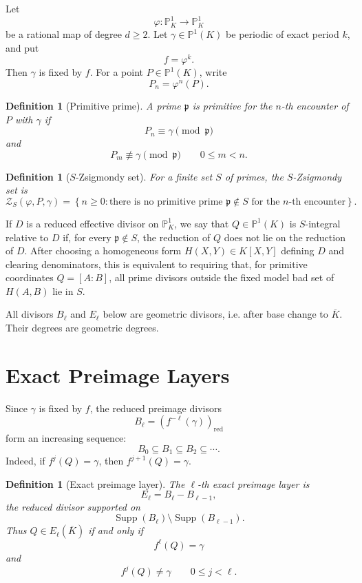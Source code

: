 \documentclass[11pt]{article}
\newtheorem{definition}[theorem]{Definition}
\begin{document}
Let
\[
\varphi:\mathbb P^1_K\to\mathbb P^1_K
\]
be a rational map of degree \(d\ge2\). Let \(\gamma\in\mathbb P^1(K)\) be periodic of exact period \(k\), and put
\[
f=\varphi^k.
\]
Then \(\gamma\) is fixed by \(f\). For a point \(P\in\mathbb P^1(K)\), write
\[
P_n=\varphi^n(P).
\]

\begin{definition}[Primitive prime]
A prime \(\mathfrak p\) is primitive for the \(n\)-th encounter of \(P\) with \(\gamma\) if
\[
P_n\equiv\gamma\pmod{\mathfrak p}
\]
and
\[
P_m\not\equiv\gamma\pmod{\mathfrak p}
\qquad
0\le m<n.
\]
\end{definition}

\begin{definition}[\(S\)-Zsigmondy set]
For a finite set \(S\) of primes, the \(S\)-Zsigmondy set is
\[
\mathcal Z_S(\varphi,P,\gamma)
=
\left\{
n\ge0:
\text{there is no primitive prime }\mathfrak p\notin S
\text{ for the }n\text{-th encounter}
\right\}.
\]
\end{definition}

If \(D\) is a reduced effective divisor on \(\mathbb P^1_K\), we say that \(Q\in\mathbb P^1(K)\) is \(S\)-integral relative to \(D\) if, for every \(\mathfrak p\notin S\), the reduction of \(Q\) does not lie on the reduction of \(D\). After choosing a homogeneous form \(H(X,Y)\in K[X,Y]\) defining \(D\) and clearing denominators, this is equivalent to requiring that, for primitive coordinates \(Q=[A:B]\), all prime divisors outside the fixed model bad set of \(H(A,B)\) lie in \(S\).

All divisors \(B_\ell\) and \(E_\ell\) below are geometric divisors, i.e. after base change to \(\overline K\). Their degrees are geometric degrees.

\section{Exact Preimage Layers}

Since \(\gamma\) is fixed by \(f\), the reduced preimage divisors
\[
B_\ell=(f^{-\ell}(\gamma))_{\mathrm{red}}
\]
form an increasing sequence:
\[
B_0\subseteq B_1\subseteq B_2\subseteq\cdots.
\]
Indeed, if \(f^j(Q)=\gamma\), then \(f^{j+1}(Q)=\gamma\).

\begin{definition}[Exact preimage layer]
The \(\ell\)-th exact preimage layer is
\[
E_\ell=B_\ell-B_{\ell-1},
\]
the reduced divisor supported on
\[
\operatorname{Supp}(B_\ell)\setminus\operatorname{Supp}(B_{\ell-1}).
\]
Thus \(Q\in E_\ell(\overline K)\) if and only if
\[
f^\ell(Q)=\gamma
\]
and
\[
f^j(Q)\ne\gamma
\qquad
0\le j<\ell.
\]
\end{definition}
\end{document}
